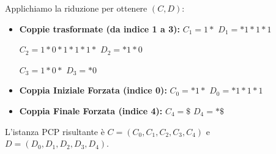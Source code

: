\documentclass[a4paper]{article}
\theoremstyle{definition} %
\theoremstyle{remark} %
\begin{document}
Applichiamo la riduzione per ottenere $(C, D)$:
\begin{itemize}
    \item \textbf{Coppie trasformate (da indice 1 a 3):}
    $C_1 = 1*$
    $D_1 = *1*1*1$

    $C_2 = 1*0*1*1*1*$
    $D_2 = *1*0$

    $C_3 = 1*0*$
    $D_3 = *0$

    \item \textbf{Coppia Iniziale Forzata (indice 0):}
    $C_0 = *1*$
    $D_0 = *1*1*1$

    \item \textbf{Coppia Finale Forzata (indice 4):}
    $C_4 = \$$
    $D_4 = *\$$
\end{itemize}
L'istanza PCP risultante è $C=(C_0, C_1, C_2, C_3, C_4)$ e $D=(D_0, D_1, D_2, D_3, D_4)$.
\end{document}
